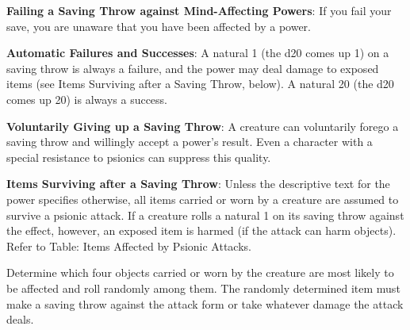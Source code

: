 \textbf{Failing a Saving Throw against Mind-Affecting Powers}: If you fail your save, you are unaware that you have been affected by a power.

\textbf{Automatic Failures and Successes}: A natural 1 (the d20 comes up 1) on a saving throw is always a failure, and the power may deal damage to exposed items (see Items Surviving after a Saving Throw, below). A natural 20 (the d20 comes up 20) is always a success.

\textbf{Voluntarily Giving up a Saving Throw}: A creature can voluntarily forego a saving throw and willingly accept a power's result. Even a character with a special resistance to psionics can suppress this quality.

\textbf{Items Surviving after a Saving Throw}: Unless the descriptive text for the power specifies otherwise, all items carried or worn by a creature are assumed to survive a psionic attack. If a creature rolls a natural 1 on its saving throw against the effect, however, an exposed item is harmed (if the attack can harm objects). Refer to Table: Items Affected by Psionic Attacks.

Determine which four objects carried or worn by the creature are most likely to be affected and roll randomly among them. The randomly determined item must make a saving throw against the attack form or take whatever damage the attack deals.

